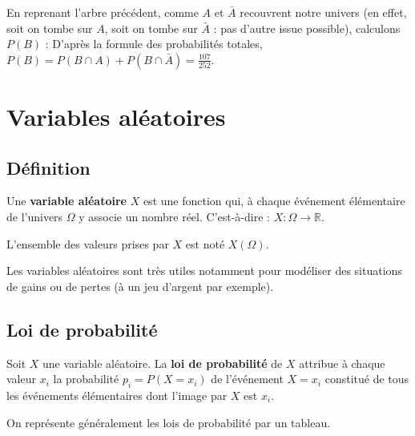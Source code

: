 	\begin{tip}[Exemple]
		En reprenant l'arbre précédent, comme $A$ et $\bar{A}$ recouvrent notre univers (en effet, soit on tombe sur $A$, soit on tombe sur $\bar{A}$ : pas d'autre issue possible), calculons $P(B)$ :
		\newpar
		D'après la formule des probabilités totales, $P(B) = P(B \cap A) + P(B \cap \bar{A}) = \frac{107}{252}$.
	\end{tip}

	\section{Variables aléatoires}

	\subsection{Définition}

	\begin{formula}[Définition]
		Une \textbf{variable aléatoire} $X$ est une fonction qui, à chaque événement élémentaire de l'univers $\Omega$ y associe un nombre réel. C'est-à-dire : $X : \Omega \rightarrow \mathbb{R}$.
	\end{formula}

	L'ensemble des valeurs prises par $X$ est noté $X(\Omega)$.

	\begin{tip}
		Les variables aléatoires sont très utiles notamment pour modéliser des situations de gains ou de pertes (à un jeu d'argent par exemple).
	\end{tip}

	\subsection{Loi de probabilité}

	\begin{formula}[Définition]
		Soit $X$ une variable aléatoire. La \textbf{loi de probabilité} de $X$ attribue à chaque valeur $x_i$ la probabilité $p_i = P(X = x_i)$ de l'événement $X = x_i$ constitué de tous les événements élémentaires dont l'image par $X$ est $x_i$.
	\end{formula}

	On représente généralement les lois de probabilité par un tableau.

